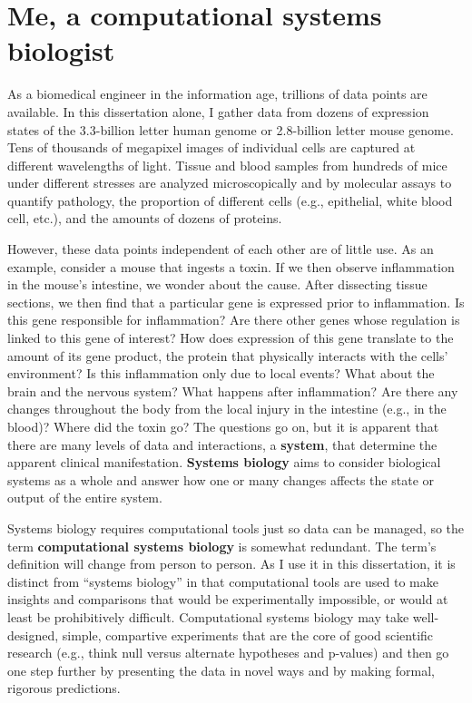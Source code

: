 \section{Me, a computational systems biologist}

As a biomedical engineer in the information age, trillions of 
data points are available. In this dissertation alone, I gather 
data from dozens of expression states of the 3.3-billion 
letter human genome or 2.8-billion letter mouse genome. Tens 
of thousands of megapixel images of individual cells are 
captured at different wavelengths of light. Tissue and blood 
samples from hundreds of mice under different stresses are 
analyzed microscopically and by molecular assays to quantify 
pathology, the proportion of different cells (e.g., epithelial, 
white blood cell, etc.), and the amounts of dozens of proteins. 

However, these data points independent of each other are of little 
use. As an example, consider a mouse that ingests a toxin. If we then observe 
inflammation in the mouse’s intestine, we wonder about the cause.
After dissecting tissue sections, we then find that a particular 
gene is expressed prior to inflammation. Is this gene responsible for 
inflammation? Are there other genes whose regulation is 
linked to this gene of interest? How does expression 
of this gene translate to the amount of its gene product, 
the protein that physically interacts with the cells’ 
environment? Is this inflammation only due to local 
events? What about the brain and the nervous system? What 
happens after inflammation? Are there any changes throughout 
the body from the local injury in the intestine (e.g., in 
the blood)? Where did the toxin go? The questions go on, 
but it is apparent that there are many levels of data and 
interactions, a \textbf{system}, that determine the apparent 
clinical manifestation. \textbf{Systems biology} aims 
to consider biological systems as a whole and answer how 
one or many changes affects the state or output of the 
entire system.

Systems biology requires computational tools just so data 
can be managed, so the term \textbf{computational systems biology} 
is somewhat redundant. The term’s definition will change 
from person to person. As I use it in this dissertation, 
it is distinct from ``systems biology'' in that computational tools 
are used to make insights and comparisons that would be experimentally 
impossible, or would at least be prohibitively difficult.
Computational systems biology may take well-designed, simple, 
compartive experiments that are the core of good scientific 
research (e.g., think null versus 
alternate hypotheses and p-values) and then go one step further
by presenting the data in novel ways and by making formal, rigorous predictions. 


